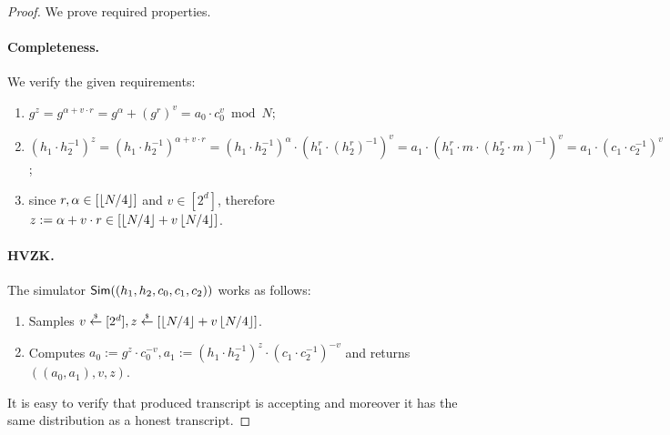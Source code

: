 \begin{proof} 
We prove required properties. 

\paragraph{Completeness.} We verify the given requirements:
\begin{enumerate}
\item $g^z = g^{\alpha + v \cdot r} = g^\alpha + (g^r)^v = a_0 \cdot c_0^v \bmod N$;
\item $(h_1\cdot h_2^{-1})^z = (h_1\cdot h_2^{-1})^{\alpha + v \cdot r} = (h_1\cdot h_2^{-1})^\alpha \cdot (h_1^r\cdot (h_2^r)^{-1})^v = a_1 \cdot (h_1^r \cdot m \cdot (h_2^r \cdot m)^{-1})^v = a_1 \cdot (c_1\cdot c_2^{-1})^v$;
\item since $r, \alpha \in [\left\lfloor N/4 \right\rfloor]$ and $v \in [2^d]$, therefore $z:= \alpha + v \cdot r \in [ \left\lfloor N/4 \right\rfloor + v\left\lfloor N/4 \right\rfloor]$. 
\end{enumerate}

\paragraph{HVZK.} The simulator $\mathsf{Sim}((h_1, h_2, c_0, c_1, c_2))$ works as follows:
\begin{enumerate}
\item Samples $v \stackrel{{\scriptscriptstyle\$}}{\leftarrow} [2^d], z \stackrel{{\scriptscriptstyle\$}}{\leftarrow} [\left\lfloor N/4 \right\rfloor + v\left\lfloor N/4 \right\rfloor]$.
\item Computes $a_0:= g^z \cdot c_0^{-v}, a_1:= (h_1 \cdot h_2^{-1})^z \cdot (c_1 \cdot c_2^{-1})^{-v}$ and returns $((a_0, a_1), v, z)$.
\end{enumerate}
It is easy to verify that produced transcript is accepting and moreover it has the same distribution as a honest transcript. 



\end{proof}
